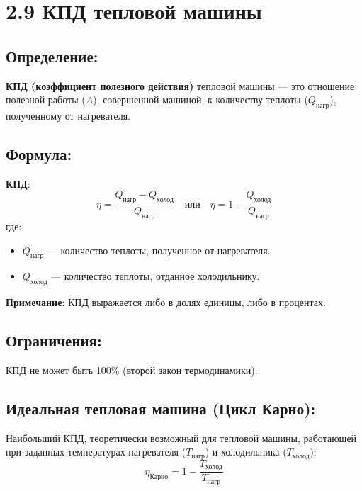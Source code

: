 \documentclass[a4paper,12pt]{article}
\begin{document}
\section*{2.9 КПД тепловой машины}
\vspace{-9pt}
\subsection*{Определение:}
\vspace{-3pt}
\textbf{КПД (коэффициент полезного действия)} тепловой машины — это отношение полезной работы ($A$), совершенной машиной, к количеству теплоты ($Q_{\text{нагр}}$), полученному от нагревателя.

\vspace{-9pt}
\subsection*{Формула:}
\vspace{-3pt}
\textbf{КПД}:
    $$ \eta = \frac{Q_{\text{нагр}} - Q_{\text{холод}}}{Q_{\text{нагр}}} \quad \text{или} \quad \eta = 1 - \frac{Q_{\text{холод}}}{Q_{\text{нагр}}} $$
    где:
\begin{itemize}
    \item $Q_{\text{нагр}}$ — количество теплоты, полученное от нагревателя.
    \item $Q_{\text{холод}}$ — количество теплоты, отданное холодильнику.
\end{itemize}
\vspace{-0.05em}
\textbf{Примечание}: КПД выражается либо в долях единицы, либо в процентах.


\vspace{-9pt}
\subsection*{Ограничения:}
\vspace{-3pt}
КПД не может быть 100\% (второй закон термодинамики).

\vspace{-9pt}
\subsection*{Идеальная тепловая машина (Цикл Карно):}
\vspace{-3pt}
Наибольший КПД, теоретически возможный для тепловой машины, работающей при заданных температурах нагревателя ($T_{\text{нагр}}$) и холодильника ($T_{\text{холод}}$):
\vspace{-0.05em}
$$ \eta_{\text{Карно}} = 1 - \frac{T_{\text{холод}}}{T_{\text{нагр}}} $$
\end{document}
